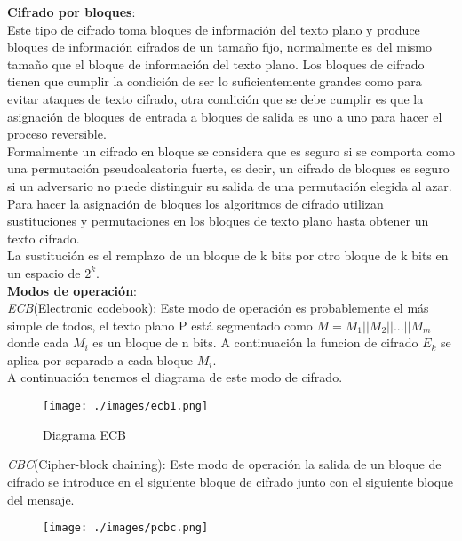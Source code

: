\documentclass[12pt,oneside,onecolumn,openany]{report}
\begin{document}
\textbf{Cifrado por bloques}:\\
Este tipo de cifrado toma bloques de información del texto plano y produce bloques de información cifrados de un tamaño fijo, normalmente es del mismo tamaño que el bloque de información del texto plano. Los bloques de cifrado tienen que cumplir la condición de ser lo suficientemente grandes como para evitar ataques de texto cifrado, otra condición que se debe cumplir es que la asignación de bloques de entrada a bloques de salida es uno a uno para hacer el proceso reversible.\\
Formalmente un cifrado en bloque se considera que es seguro si se comporta como una permutación pseudoaleatoria fuerte, es decir, un cifrado de bloques es seguro si un adversario no puede distinguir su salida de una permutación elegida al azar.\\
Para hacer la asignación de bloques los algoritmos de cifrado utilizan sustituciones y permutaciones en los bloques de texto plano hasta obtener un texto cifrado.\\
La sustitución es el remplazo de un bloque de k bits por otro bloque de k bits en un espacio de \(2^{k}\).\cite{bloc}\\


\pagebreak
\textbf{Modos de operación}:\\
\textit{ECB}(Electronic codebook): Este modo de operación es probablemente el más simple de todos, el texto plano P está segmentado como $ M=M_1||M_2||...||M_m$ donde cada $M_i$ es un bloque de n bits. A continuación la funcion de cifrado $E_k$ se aplica por separado a cada bloque $M_i$. \\
A continuación tenemos el diagrama de este modo de cifrado.\\
\begin{figure}[H]
\centering
	\texttt{[image: ./images/ecb1.png]}
	\caption{Diagrama ECB}
	\label{fig:1-3-1}
\end{figure}



\textit{CBC}(Cipher-block chaining): Este modo de operación la salida de un bloque de cifrado se introduce en el siguiente bloque de cifrado junto con el siguiente bloque del mensaje.\\


 \begin{figure}[H]
 \centering
	\texttt{[image: ./images/pcbc.png]}
	
\end{figure}
\end{document}
